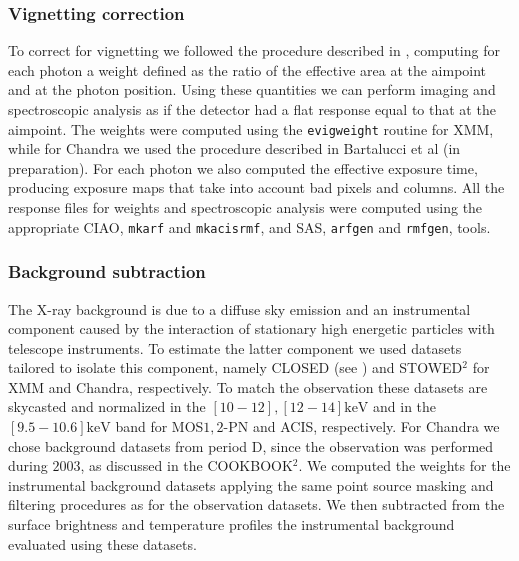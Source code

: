 \documentclass[twocolumn,traditabstract]{aa}
\begin{document}
\subsubsection{Vignetting correction}
To correct for vignetting we followed the procedure described in \cite{arnaud2001}, computing for each photon a weight defined as the ratio of the effective area at the aimpoint and at  the photon position. Using these quantities we can perform imaging and spectroscopic analysis as if the detector had a flat response equal to that at the aimpoint. The weights were computed using the \verb?evigweight? routine for XMM, while for Chandra we used the procedure described in Bartalucci et al (in preparation). For each photon we also computed the effective exposure time, producing exposure maps that take into account bad pixels and columns. All the response files for weights and spectroscopic analysis were computed using the appropriate CIAO, \verb?mkarf? and \verb?mkacisrmf?, and SAS, \verb?arfgen? and \verb?rmfgen?, tools.

\subsubsection{Background subtraction}
The X-ray background is due to a diffuse sky emission and an instrumental component caused by the interaction of stationary high energetic particles with telescope instruments. To estimate the latter component we used datasets tailored to isolate this component, namely CLOSED (see \citealt{pratt2009}) and STOWED$^2$ for XMM and Chandra, respectively. To match the observation these datasets are skycasted and normalized in the $[10-12],[12-14]\si{\kilo\electronvolt}$ and in the $[9.5-10.6]\si{\kilo\electronvolt}$ band for MOS$1,2$-PN and ACIS, respectively. For Chandra we chose background datasets from period D, since the observation was performed during $2003$, as discussed in the COOKBOOK$^2$. We computed the weights for the instrumental background datasets applying the same point source masking and filtering procedures as for the observation datasets. We then subtracted from the surface brightness and temperature profiles the instrumental background evaluated using these datasets.
\end{document}
